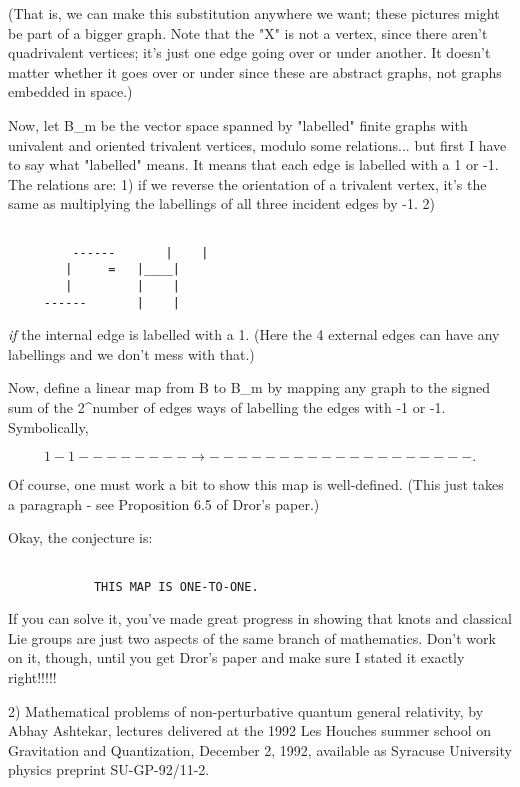 (That is, we can make this substitution anywhere we want; these pictures
might be part of a bigger graph.  Note that the "X" is not a vertex,
since there aren't quadrivalent vertices; it's just one edge going over
or under another.  It doesn't matter whether it goes over or under since
these are abstract graphs, not graphs embedded in space.)  

Now, let B_m be the vector space spanned by "labelled" finite graphs
with univalent and oriented trivalent vertices, modulo some relations...
but first I have to say what "labelled" means.  It means that each edge
is labelled with a 1 or -1.  The relations are: 1) if we reverse the
orientation of a trivalent vertex, it's the same as multiplying the
labellings of all three incident edges by -1.  2)   


\begin{verbatim}

         ------       |    |     
	    |     =   |____|  
	    |         |    |     
	 ------       |    |     
\end{verbatim}
    

\emph{if} the internal edge is labelled with a 1.  (Here the 4 external edges
can have any labellings and we don't mess with that.)

Now, define a linear map from B to B_m by mapping any graph to the
signed sum of the 2^{number of edges} ways of labelling the edges with -1
or -1.  Symbolically,


$$

                                1            -1
		-------- \to  ---------  -  --------- .
$$
    

Of course, one must work a bit to show this map is well-defined.  (This
just takes a paragraph - see Proposition 6.5 of Dror's paper.)  

Okay, the conjecture is:


\begin{verbatim}

			THIS MAP IS ONE-TO-ONE.

\end{verbatim}
    

If you can solve it, you've made great progress in showing that knots
and classical Lie groups are just two aspects of the same branch of
mathematics.  Don't work on it, though, until you get Dror's paper and
make sure I stated it exactly right!!!!!

2)  Mathematical problems of non-perturbative quantum general
relativity, by Abhay Ashtekar, lectures delivered at the 1992 Les
Houches summer school on Gravitation and Quantization, December 2, 1992,
available as Syracuse University physics preprint SU-GP-92/11-2. 

